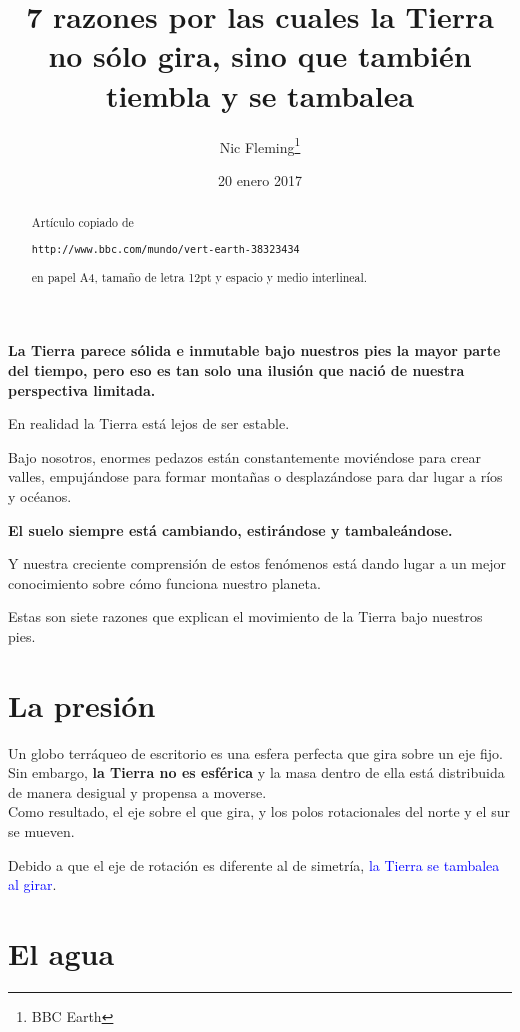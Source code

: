 \documentclass[12pt,a4paper]{article}
\title{7 razones por las cuales la Tierra no sólo gira, sino que también tiembla y se tambalea}
\author{Nic Fleming\thanks{BBC Earth}}
\date{20 enero 2017}
\begin{document}
\maketitle

\tableofcontents

\newpage

\renewcommand{\spanishabstractname}{Resumen}

{\flushleft\begin{abstract}
Artículo copiado de

\texttt{http://www.bbc.com/mundo/vert-earth-38323434}

en papel A4, tamaño de letra 12pt y espacio y medio interlineal.
\end{abstract}}

{\bfseries\normalsize 
La Tierra parece sólida e inmutable bajo nuestros pies la mayor parte del tiempo, pero eso es tan solo una ilusión que nació de nuestra perspectiva limitada.
}

En realidad la Tierra está lejos de ser estable.

Bajo nosotros, enormes pedazos están constantemente moviéndose para crear valles, empujándose para formar montañas o desplazándose para dar lugar a ríos y océanos.

{\bfseries\sffamily
El suelo siempre está cambiando, estirándose y tambaleándose.
}

Y nuestra creciente comprensión de estos fenómenos está dando lugar a un mejor conocimiento sobre cómo funciona nuestro planeta.

{\Large
Estas son siete razones que explican el movimiento de la Tierra bajo nuestros pies.
}

\section{La presión}

Un globo terráqueo de escritorio es una esfera perfecta que gira sobre un eje fijo. Sin embargo, \textbf{la Tierra no es esférica} y la masa dentro de ella está distribuida de manera desigual y propensa a moverse.\\[5mm]

Como resultado, el eje sobre el que gira, y los polos rotacionales del norte y el sur se mueven.

Debido a que el eje de rotación es diferente al de simetría, \textcolor{blue}{\large la Tierra se tambalea al girar}.

\section{El agua}
\end{document}
